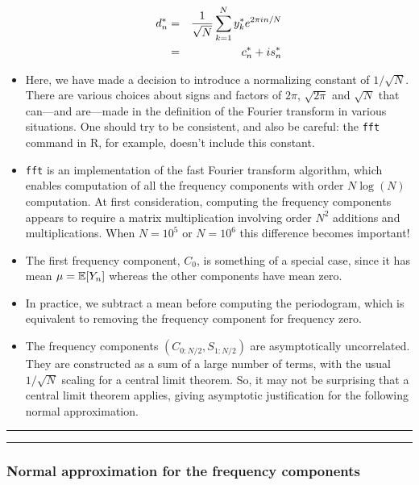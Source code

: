 \documentclass[]{article}
\begin{document}
\begin{itemize}
  \begin{eqnarray}
  d_n^* &=& \frac{1}{\sqrt{N}} \sum_{k=1}^N y_k^* e^{2\pi i n/N}
  \\
  &=&c_n^* + is_n^*
  \end{eqnarray}
\item
  Here, we have made a decision to introduce a normalizing constant of
  \(1/\sqrt{N}\). There are various choices about signs and factors of
  \(2\pi\), \(\sqrt{2\pi}\) and \(\sqrt{N}\) that can---and are---made
  in the definition of the Fourier transform in various situations. One
  should try to be consistent, and also be careful: the \texttt{fft}
  command in R, for example, doesn't include this constant.
\item
  \texttt{fft} is an implementation of the fast Fourier transform
  algorithm, which enables computation of all the frequency components
  with order \(N\log(N)\) computation. At first consideration, computing
  the frequency components appears to require a matrix multiplication
  involving order \(N^2\) additions and multiplications. When \(N=10^5\)
  or \(N=10^6\) this difference becomes important!
\item
  The first frequency component, \(C_0\), is something of a special
  case, since it has mean \(\mu=\mathbb{E}[Y_n]\) whereas the other components
  have mean zero.
\item
  In practice, we subtract a mean before computing the periodogram,
  which is equivalent to removing the frequency component for frequency
  zero.
\item
  The frequency components \((C_{0:N/2},S_{1:N/2})\) are asymptotically
  uncorrelated. They are constructed as a sum of a large number of
  terms, with the usual \(1/\sqrt{N}\) scaling for a central limit
  theorem. So, it may not be surprising that a central limit theorem
  applies, giving asymptotic justification for the following normal
  approximation.
\end{itemize}

\begin{center}\rule{0.5\linewidth}{\linethickness}\end{center}

\begin{center}\rule{0.5\linewidth}{\linethickness}\end{center}

\subsubsection{Normal approximation for the frequency
components}\label{normal-approximation-for-the-frequency-components}
\end{document}
